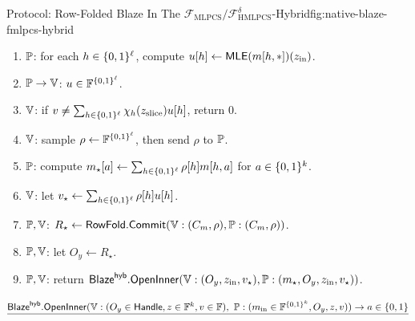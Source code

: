\begin{protocolbox}{Protocol: Row-Folded Blaze In The \(\mathcal F_{\mathrm{MLPCS}}/\mathcal F_{\mathrm{HMLPCS}}^\delta\)-Hybrid}{fig:native-blaze-fmlpcs-hybrid}
\smallskip
\begin{enumerate}[leftmargin=0.24in,label=\textbf{O\arabic*.},itemsep=0.06em,topsep=0.06em,parsep=0pt]
  \item \(\mathbb{P}\): for each \(h\in\{0,1\}^\ell\), compute
        \(u[h]\gets\mathsf{MLE}(m[h,\ast])(z_{\mathrm{in}})\).
  \item \(\mathbb{P}\to\mathbb{V}\): \(u\in\mathbb{F}^{\{0,1\}^\ell}\).
  \item \(\mathbb{V}\): if
        \(v\ne\sum_{h\in\{0,1\}^\ell}\chi_h(z_{\mathrm{slice}})u[h]\), return
        \(0\).
  \item \(\mathbb{V}\): sample \(\rho\leftarrow\mathbb{F}^{\{0,1\}^\ell}\), then send
        \(\rho\) to \(\mathbb{P}\).
  \item \(\mathbb{P}\): compute
        \(m_\star[a]\gets\sum_{h\in\{0,1\}^\ell}\rho[h]m[h,a]\) for
        \(a\in\{0,1\}^k\).
  \item \(\mathbb{V}\): let
        \(v_\star\gets\sum_{h\in\{0,1\}^\ell}\rho[h]u[h]\).
  \item \(\mathbb{P},\mathbb{V}\): \(R_\star\gets
        \mathsf{RowFold.Commit}(\mathbb{V}:(C_m,\rho),\mathbb{P}:(C_m,\rho))\).
  \item \(\mathbb{P},\mathbb{V}\): let \(O_y\gets R_\star\).
  \item \(\mathbb{P},\mathbb{V}\): return
        \(\mathsf{Blaze}^{\mathsf{hyb}}.\mathsf{OpenInner}
        (\mathbb{V}:(O_y,z_{\mathrm{in}},v_\star),
        \mathbb{P}:(m_\star,O_y,z_{\mathrm{in}},v_\star))\).
\end{enumerate}

\smallskip
\noindent\(\underline{\mathsf{Blaze}^{\mathsf{hyb}}.\mathsf{OpenInner}(\verifier:(O_y\in\Handle,z\in\F^k,v\in\F),\ \prover:(m_{\mathrm{in}}\in\F^{\B^k},O_y,z,v))\to a\in\{0,1\}}\)


\end{protocolbox}
